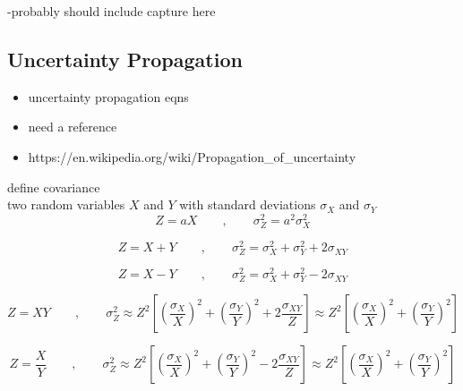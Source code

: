 -probably should include capture here


\subsection{Uncertainty Propagation}
\label{subsec:chap3-uncertainty-prop}

\begin{itemize}[noitemsep]
  \item uncertainty propagation eqns
  \item need a reference
  \item https://en.wikipedia.org/wiki/Propagation_of_uncertainty
\end{itemize}

define covariance\\
two random variables $X$ and $Y$ with standard deviations $\sigma_{X}$ and $\sigma_{Y}$\\

\begin{equation}
Z = aX \qquad,\qquad \sigma_{Z}^{2} = a^{2}\sigma_{X}^{2}
\end{equation}

\begin{equation}
Z = X + Y \qquad,\qquad \sigma_{Z}^{2} = \sigma_{X}^{2} + \sigma_{Y}^{2} + 2\sigma_{XY}
\end{equation}

\begin{equation}
Z = X - Y \qquad,\qquad \sigma_{Z}^{2} = \sigma_{X}^{2} + \sigma_{Y}^{2} - 2\sigma_{XY}
\end{equation}

\begin{equation}
Z = XY \qquad,\qquad \sigma_{Z}^{2} \approx Z^{2}\left[\left(\frac{\sigma_{X}}{X}\right)^{2} + \left(\frac{\sigma_{Y}}{Y}\right)^{2} + 2\frac{\sigma_{XY}}{Z}\right] \approx Z^{2}\left[\left(\frac{\sigma_{X}}{X}\right)^{2} + \left(\frac{\sigma_{Y}}{Y}\right)^{2}\right]
\end{equation}

\begin{equation}
Z = \frac{X}{Y} \qquad,\qquad \sigma_{Z}^{2} \approx Z^{2}\left[\left(\frac{\sigma_{X}}{X}\right)^{2} + \left(\frac{\sigma_{Y}}{Y}\right)^{2} - 2\frac{\sigma_{XY}}{Z}\right] \approx Z^{2}\left[\left(\frac{\sigma_{X}}{X}\right)^{2} + \left(\frac{\sigma_{Y}}{Y}\right)^{2}\right]
\end{equation}


